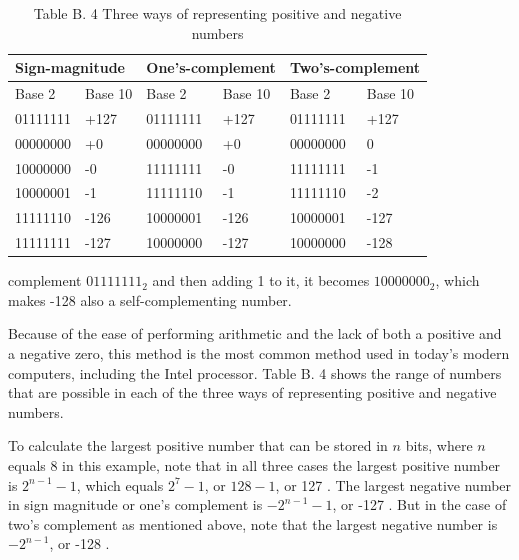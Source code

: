 \documentclass[10pt]{article}
\begin{document}
\begin{table}[h]
\begin{center}
\captionsetup{labelformat=empty}
\caption{Table B. 4 Three ways of representing positive and negative numbers}
\begin{tabular}{|l|l|l|l|l|l|}
\hline
\multicolumn{2}{|l|}{Sign-magnitude} & \multicolumn{2}{|l|}{One's-complement} & \multicolumn{2}{|l|}{Two's-complement} \\
\hline
Base 2 & Base 10 & Base 2 & Base 10 & Base 2 & Base 10 \\
\hline
01111111 & +127 & 01111111 & +127 & 01111111 & +127 \\
\hline
00000000 & +0 & 00000000 & +0 & 00000000 & 0 \\
\hline
10000000 & -0 & 11111111 & -0 & 11111111 & -1 \\
\hline
10000001 & -1 & 11111110 & -1 & 11111110 & -2 \\
\hline
11111110 & -126 & 10000001 & -126 & 10000001 & -127 \\
\hline
11111111 & -127 & 10000000 & -127 & 10000000 & -128 \\
\hline
\end{tabular}
\end{center}
\end{table}

complement $01111111_{2}$ and then adding 1 to it, it becomes $10000000_{2}$, which makes -128 also a self-complementing number.

Because of the ease of performing arithmetic and the lack of both a positive and a negative zero, this method is the most common method used in today's modern computers, including the Intel processor. Table B. 4 shows the range of numbers that are possible in each of the three ways of representing positive and negative numbers.

To calculate the largest positive number that can be stored in $n$ bits, where $n$ equals 8 in this example, note that in all three cases the largest positive number is $2^{n-1}-1$, which equals $2^{7}-1$, or $128-1$, or 127 . The largest negative number in sign magnitude or one's complement is $-2^{n-1}-1$, or -127 . But in the case of two's complement as mentioned above, note that the largest negative number is $-2^{n-1}$, or -128 .
\end{document}
